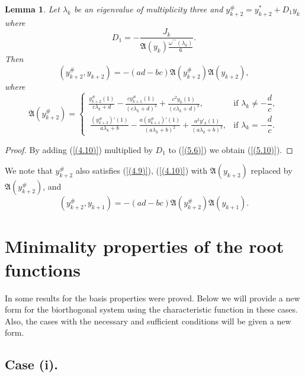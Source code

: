 \documentclass[10pt,a4paper]{amsart}
\newtheorem{lem}[thm]{Lemma}
\numberwithin{equation}{section}
\begin{document}
\begin{lem}
Let $\lambda_k$ be an eigenvalue of multiplicity three and
$y^{\#}_{k+2}=y^{*}_{k+2}+D_{1}y_{k}$
where
\begin{equation}
    D_1 =-\frac{J_k}{\mathfrak{A}(y_k)\frac{\omega^{\prime\prime\prime}(\lambda_k)}{6}}. \label{(5.9)}
\end{equation}
Then 
\begin{equation}
(y_{k+2}^\#, y_{k+2}) =-(ad-bc)\mathfrak{A}(y_{k+2}^\#)\mathfrak{A}(y_{k+2}), \label{(5.10)}
\end{equation}
where
\begin{equation}
\mathfrak{A}(y^{\#}_{k+2}) =
\begin{cases}
\displaystyle  
\frac{y^{\#}_{k + 2}(1)}{c\lambda_{k} + d} - \frac{cy^{\#}_{k+1}(1)}{\left( c\lambda_{k} + d \right)^{2}}
+\frac{c^2y_{k}(1)}{\left( c\lambda_{k} + d \right)^{3}}, 
& \text{if } \lambda_k \neq -\dfrac{d}{c}, \\[10pt]
\displaystyle \ 
\frac{(y^{\#}_{k + 2})'(1)}{a\lambda_{k} + b} - \frac{a(y^{\#}_{k+1})'(1)}{\left( a\lambda_{k} + b \right)^{2}}
+\frac{a^2y'_{k}(1)}{\left( a\lambda_{k} + b\right)^{3}}, 
& \text{if }  \lambda_k = -\dfrac{d}{c}.
\end{cases}\label{(5.5.3)}  
\end{equation}
\end{lem}

\begin{proof} By adding (\ref{(4.10)}) multiplied by $D_1$ to (\ref{(5.6)}) we obtain (\ref{(5.10)}).
\end{proof}
We note that $y^{\#}_{k+2}$ also satisfies (\ref{(4.9)}), (\ref{(4.10)}) with  $\mathfrak{A}(y_{k+2})$ replaced by $\mathfrak{A}(y_{k+2}^\#)$, and 
\begin{equation}
(y_{k+2}^\#, y_{k+1}) =-(ad-bc)\mathfrak{A}(y_{k+2}^\#)\mathfrak{A}(y_{k+1}). \label{(5.11)}
\end{equation}
\section{Minimality properties of the root functions}
In \cite{aliyev5} some results for the basis properties were proved.  Below we will provide a new form for the biorthogonal system using the characteristic function in these cases. Also, the cases with the necessary and sufficient conditions will be given a new form.
\subsection{Case (i).}
\end{document}
